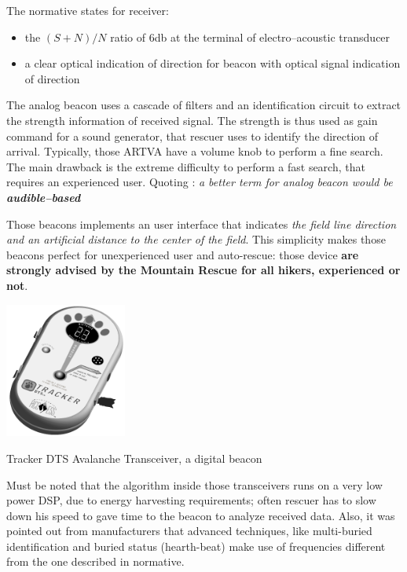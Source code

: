 The normative states for receiver:
\begin{itemize}
	\item the $(S+N)/N$ ratio of \num{6}\si{\decibel} at the terminal of electro--acoustic transducer
	\item a clear optical indication of direction for beacon with optical signal indication of direction
\end{itemize}

The analog beacon uses a cascade of filters and an identification circuit to extract the strength information of received signal. The strength is thus used as gain command for a sound generator, that rescuer uses to identify the direction of arrival. Typically, those ARTVA have a volume knob to perform a fine search. The main drawback is the extreme difficulty to perform a fast search, that requires an experienced user. Quoting \citep{457andfuture}: \emph{a better term for analog beacon would be \textbf{audible--based}}

Those beacons implements an user interface that indicates \emph{the field line direction and an artificial distance to the center of the field}. This simplicity makes those beacons perfect for unexperienced user and auto-rescue: those device \textbf{are strongly advised by the Mountain Rescue for all hikers, experienced or not}.

\begin{marginfigure}
	\centering
	\includegraphics[width=4cm]{ch1/img/digital_baecon}
	\caption{Tracker DTS Avalanche Transceiver, a digital beacon}
\end{marginfigure}

Must be noted that the algorithm inside those transceivers runs on a very low power DSP, due to energy harvesting requirements; often rescuer has to slow down his speed to gave time to the beacon to analyze received data. Also, it was pointed out from manufacturers that advanced techniques, like multi-buried identification and buried status (hearth-beat) make use of frequencies different from the one described in normative.

